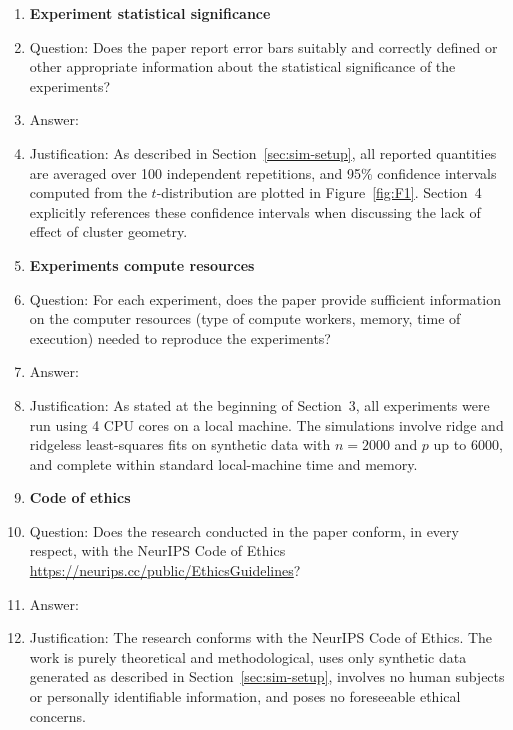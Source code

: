 \begin{enumerate}
\item {\bf Experiment statistical significance}
    \item[] Question: Does the paper report error bars suitably and correctly defined or other appropriate information about the statistical significance of the experiments?
    \item[] Answer: \answerYes{} %
    \item[] Justification:  As described in Section~\ref{sec:sim-setup}, all reported quantities are averaged over 100 independent repetitions, and 95\% confidence intervals computed from the $t$-distribution are plotted in Figure~\ref{fig:F1}. Section~4 explicitly references these confidence intervals when discussing the lack of effect of cluster geometry.
    

\item {\bf Experiments compute resources}
    \item[] Question: For each experiment, does the paper provide sufficient information on the computer resources (type of compute workers, memory, time of execution) needed to reproduce the experiments?
    \item[] Answer: \answerYes{} %
    \item[] Justification: As stated at the beginning of Section~3, all experiments were run using 4 CPU cores on a local machine. The simulations involve ridge and ridgeless least-squares fits on synthetic data with $n = 2000$ and $p$ up to $6000$, and complete within standard local-machine time and memory.
    
    
\item {\bf Code of ethics}
    \item[] Question: Does the research conducted in the paper conform, in every respect, with the NeurIPS Code of Ethics \url{https://neurips.cc/public/EthicsGuidelines}?
    \item[] Answer: \answerYes{} %
    \item[] Justification: The research conforms with the NeurIPS Code of Ethics. The work is purely theoretical and methodological, uses only synthetic data generated as described in Section~\ref{sec:sim-setup}, involves no human subjects or personally identifiable information, and poses no foreseeable ethical concerns.
    



\end{enumerate}
